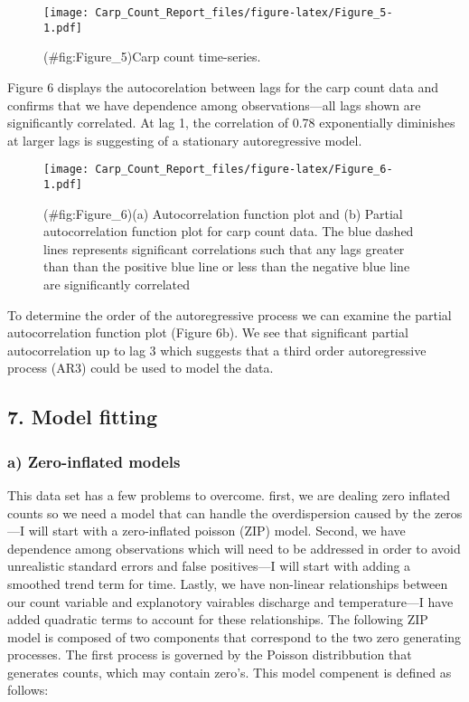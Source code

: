 \documentclass[]{article}
\begin{document}
\begin{figure}[htbp]
\centering
\texttt{[image: Carp\_Count\_Report\_files/figure-latex/Figure\_5-1.pdf]}
\caption{(\#fig:Figure\_5)Carp count time-series.}
\end{figure}

Figure 6 displays the autocorelation between lags for the carp count
data and confirms that we have dependence among observations---all lags
shown are significantly correlated. At lag 1, the correlation of 0.78
exponentially diminishes at larger lags is suggesting of a stationary
autoregressive model.

\begin{figure}[htbp]
\centering
\texttt{[image: Carp\_Count\_Report\_files/figure-latex/Figure\_6-1.pdf]}
\caption{(\#fig:Figure\_6)(a) Autocorrelation function plot and (b)
Partial autocorrelation function plot for carp count data. The blue
dashed lines represents significant correlations such that any lags
greater than than the positive blue line or less than the negative blue
line are significantly correlated}
\end{figure}

To determine the order of the autoregressive process we can examine the
partial autocorrelation function plot (Figure 6b). We see that
significant partial autocorrelation up to lag 3 which suggests that a
third order autoregressive process (AR3) could be used to model the
data.

\subsection{7. Model fitting}\label{model-fitting}

\subsubsection{a) Zero-inflated models}\label{a-zero-inflated-models}

This data set has a few problems to overcome. first, we are dealing zero
inflated counts so we need a model that can handle the overdispersion
caused by the zeros---I will start with a zero-inflated poisson (ZIP)
model. Second, we have dependence among observations which will need to
be addressed in order to avoid unrealistic standard errors and false
positives---I will start with adding a smoothed trend term for time.
Lastly, we have non-linear relationships between our count variable and
explanotory vairables discharge and temperature---I have added quadratic
terms to account for these relationships. The following ZIP model is
composed of two components that correspond to the two zero generating
processes. The first process is governed by the Poisson distribbution
that generates counts, which may contain zero's. This model compenent is
defined as follows:
\end{document}
